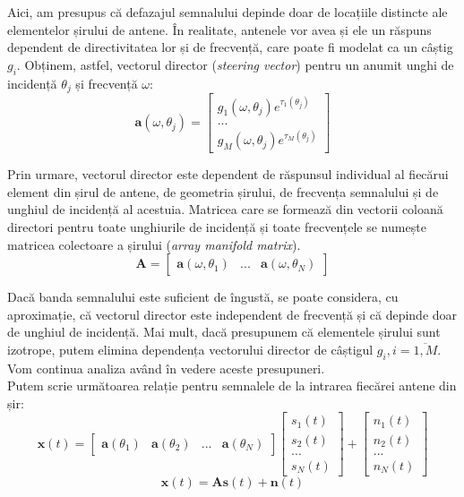 Aici, am presupus că defazajul semnalului depinde doar de locațiile distincte
ale elementelor șirului de antene. În realitate, antenele vor avea și ele un
răspuns dependent de directivitatea lor și de frecvență, care poate fi modelat
ca un câștig $g_i$. Obținem, astfel, vectorul director (\textit{steering
vector}) pentru un anumit unghi de incidență $\theta_j$ și frecvență $\omega$:
\begin{equation}
    \bm{a}(\omega, \theta_j) = 
	    \begin{bmatrix}
		g_1(\omega, \theta_j)e^{\tau_1(\theta_j)} \\
		... \\
		g_M(\omega, \theta_j)e^{\tau_M(\theta_j)}
	    \end{bmatrix}
\end{equation}

Prin urmare, vectorul director este dependent de răspunsul individual al
fiecărui element din șirul de antene, de geometria șirului, de frecvența
semnalului și de unghiul de incidență al acestuia. Matricea care se formează din
vectorii coloană directori pentru toate unghiurile de incidență și toate
frecvențele se numește matricea colectoare a șirului
(\textit{array manifold matrix}).
\begin{equation}
    \bm{A} = 
	    \begin{bmatrix}
		\bm{a}(\omega, \theta_1) & ... & \bm{a}(\omega, \theta_N)
	    \end{bmatrix}
\end{equation}

Dacă banda semnalului este suficient de îngustă, se poate considera, cu
aproximație, că vectorul director este independent de frecvență și că depinde doar
de unghiul de incidență. Mai mult, dacă presupunem că elementele șirului sunt
izotrope, putem elimina dependența vectorului director de câștigul $g_i,
i = \overline{1, M}$. Vom continua analiza având în vedere aceste presupuneri.\\

Putem scrie următoarea relație pentru semnalele de la intrarea fiecărei antene
din șir:
\begin{equation}
\label{eq:xasn}    
    \bm{x}(t) = 
	\begin{bmatrix}
	   \bm{a}(\theta_1) & \bm{a}(\theta_2) & ... & \bm{a}(\theta_N)
	\end{bmatrix}
	\begin{bmatrix}
	    s_1(t) \\ s_2(t) \\ ... \\ s_N(t)
	\end{bmatrix}
	+
	\begin{bmatrix}
	    n_1(t) \\ n_2(t) \\ ... \\ n_N(t)
	\end{bmatrix}
\end{equation}
\begin{equation}
\label{eq:xasn-short}
    \bm{x}(t) = \bm{A}\bm{s}(t) + \bm{n}(t)
\end{equation}

